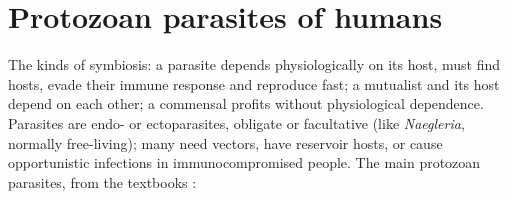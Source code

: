 \section{Protozoan parasites of humans}
\label{section-parasites}

The kinds of
symbiosis: a parasite depends physiologically
on its host, must find hosts, evade their
immune response and reproduce fast; a
mutualist and its host depend on each other;
a commensal profits without physiological
dependence. Parasites are endo- or
ectoparasites, obligate or facultative (like
\emph{Naegleria}, normally free-living); many
need vectors, have reservoir hosts, or cause
opportunistic infections in immunocompromised
people. The main protozoan parasites, from
the textbooks \cite[Chapter
12]{tortora2013microbiology} \cite[Chapter
39]{willey2008prescott} \cite[Chapter
5]{hickman2002animal}:

